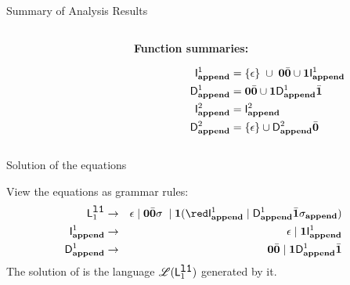 \documentclass[xcolor=x11names,compress,mathserif]{beamer}
\renewcommand{\(}{\begin{columns}}
\renewcommand{\)}{\end{columns}}
\newcommand{\<}[1]{\begin{column}{#1}}
\renewcommand{\>}{\end{column}}
\begin{document}
\begin{frame}[t]{Summary of Analysis Results}
\begin{columns}[c]
\begin{column}[T]{0.33\textwidth}
\end{column}
\begin{column}[T]{0.33\textwidth}
\vspace*{1.5cm}
\centerline{\bf Function summaries:}
{\red
\begin{align*}
        \mathsf{I}_{\mathit {\mathbf{append}}}^{1} &= \{\epsilon\}\;  \cup\;
      \mathbf{0}\bar{\mathbf{0}}\cup  
      \mathbf{1}\mathsf{I}_{\mathit {\mathbf{append}}}^{1}\\
  \mathsf{D}_{\mathit {\mathbf{append}}}^{1} &= \mathbf{0}\bar{\mathbf{0}}\cup\mathbf{1} \mathsf{D}_{\mathit {\mathbf{append}}}^{1}\bar{\mathbf{1}}\\
  \mathsf{I}_{\mathit {\mathbf{append}}}^{2} &= \mathsf{I}_{\mathit {\mathbf{append}}}^{2}\\
  \mathsf{D}_{\mathit {\mathbf{append}}}^{2} &= \{\epsilon\} \cup \mathsf{D}_{\mathit {\mathbf{append}}}^{2}\bar{\mathbf{0}}
  \end{align*}}
  \end{column}
\end{columns}
\end{frame}

\begin{frame}{Solution of the equations}

  View the equations as grammar rules:
\begin{eqnarray*}
    \Lanv{1}{\lista} &\rightarrow& \epsilon \mid  \acar\bcar\sigma\; \mid 
    \acdr({\red \Uf{\append}{1} \mid \Df{\append}{1}\bcdr\sigma_{\append}})\\
  \Uf{\append}{1}    &\rightarrow&    \epsilon   \mid
   \acdr{\Uf{\append}{1}}\\         
   \Df{\append}{1}
   &\rightarrow&               \acar\bcar               \mid
   \acdr\Df{\append}{1}\bcdr\\
 \end{eqnarray*}
The  solution of  is the   language  $\mathscr{L}(\mathsf{L}_{{1}}^{\mbox{\tt l1}})$ generated    by    it.
\end{frame}
\end{document}
